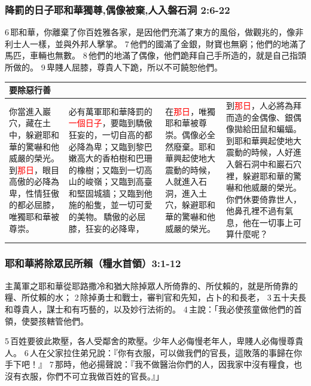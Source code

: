 \subsubsection{降罰的日子耶和華獨尊,偶像被棄,人入磐石洞 2:6-22}
6 耶和華，你離棄了你百姓雅各家，是因他們充滿了東方的風俗，做觀兆的，像非利士人一樣，並與外邦人擊掌。 7 他們的國滿了金銀，財寶也無窮；他們的地滿了馬匹，車輛也無數。 8 他們的地滿了偶像，他們跪拜自己手所造的，就是自己指頭所做的。 9 卑賤人屈膝，尊貴人下跪，所以不可饒恕他們。 
\begin{table}[H]
\centering 
\begin{tabular}{p{2.75cm}|p{}|p{2.75cm}|p{4.5cm}}\hline\hline
要除惡行善&&&\\\hline
你當進入巖穴，藏在土中，躲避耶和華的驚嚇和他威嚴的榮光。到\textcolor{red}{那日}，眼目高傲的必降為卑，性情狂傲的都必屈膝，唯獨耶和華被尊崇。
&必有萬軍耶和華降罰的\textcolor{red}{一個日子}，要臨到驕傲狂妄的，一切自高的都必降為卑；又臨到黎巴嫩高大的香柏樹和巴珊的橡樹；又臨到一切高山的峻嶺；又臨到高臺和堅固城牆；又臨到他施的船隻，並一切可愛的美物。 驕傲的必屈膝，狂妄的必降卑，
&在\textcolor{red}{那日}，唯獨耶和華被尊崇。偶像必全然廢棄。耶和華興起使地大震動的時候，人就進入石洞，進入土穴，躲避耶和華的驚嚇和他威嚴的榮光。
&到\textcolor{red}{那日}，人必將為拜而造的金偶像、銀偶像拋給田鼠和蝙蝠。到耶和華興起使地大震動的時候，人好進入磐石洞中和巖石穴裡，躲避耶和華的驚嚇和他威嚴的榮光。你們休要倚靠世人，他鼻孔裡不過有氣息，他在一切事上可算什麼呢？\\\hline
\end{tabular}
\end{table}

\subsubsection{耶和華將除眾民所賴（糧水首領）3:1-12}
主萬軍之耶和華從耶路撒冷和猶大除掉眾人所倚靠的、所仗賴的，就是所倚靠的糧、所仗賴的水； 2 除掉勇士和戰士，審判官和先知，占卜的和長老， 3 五十夫長和尊貴人，謀士和有巧藝的，以及妙行法術的。 4 主說：「我必使孩童做他們的首領，使嬰孩轄管他們。 

5 百姓要彼此欺壓，各人受鄰舍的欺壓。少年人必侮慢老年人，卑賤人必侮慢尊貴人。 6 人在父家拉住弟兄說：『你有衣服，可以做我們的官長，這敗落的事歸在你手下吧！』 7 那時，他必揚聲說：『我不做醫治你們的人，因我家中沒有糧食，也沒有衣服，你們不可立我做百姓的官長。』」 



